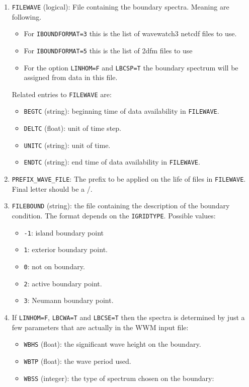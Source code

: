 \documentclass[12pt]{amsart}
\begin{document}
\begin{enumerate}
\item {\tt FILEWAVE} (logical): File containing the boundary spectra. Meaning are following.
  \begin{itemize}
  \item For {\tt IBOUNDFORMAT=3} this is the list of wavewatch3 netcdf files to use.
  \item For {\tt IBOUNDFORMAT=5} this is the list of 2dfm files to use
  \item For the option {\tt LINHOM=F} and {\tt LBCSP=T} the boundary spectrum will be assigned from data in this file.
  \end{itemize}
  Related entries to {\tt FILEWAVE} are:
  \begin{itemize}
  \item {\tt BEGTC} (string): beginning time of data availability in {\tt FILEWAVE}.
  \item {\tt DELTC} (float): unit of time step.
  \item {\tt UNITC} (string): unit of time.
  \item {\tt ENDTC} (string): end time of data availability in {\tt FILEWAVE}.
  \end{itemize}
\item {\tt PREFIX\_WAVE\_FILE}: The prefix to be applied on the life of files in {\tt FILEWAVE}. Final letter should be a /.
\item {\tt FILEBOUND} (string): the file containing the description of the boundary condition. The format depends on the {\tt IGRIDTYPE}. Possible values:
  \begin{itemize}
  \item {\tt -1}: island boundary point
  \item {\tt 1}: exterior boundary point.
  \item {\tt 0}: not on boundary.
  \item {\tt 2}: active boundary point.
  \item {\tt 3}: Neumann boundary point.
  \end{itemize}
\item If {\tt LINHOM=F}, {\tt LBCWA=T} and {\tt LBCSE=T} then the spectra is determined by just a few parameters that are actually in the WWM input file:
  \begin{itemize}
  \item {\tt WBHS} (float): the significant wave height on the boundary.
  \item {\tt WBTP} (float): the wave period used.
  \item {\tt WBSS} (integer): the type of spectrum chosen on the boundary:

\end{itemize}
\end{enumerate}
\end{document}
